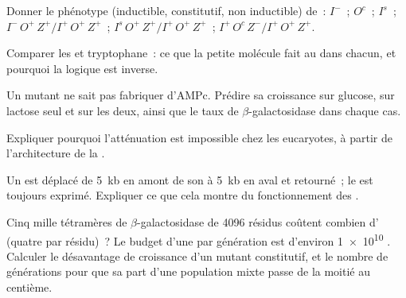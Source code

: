 \begin{exercise}[$\star\star$]\label{exo:b1:expression-control:5}
Donner le phénotype (inductible, constitutif, non inductible) de~: $I^-$~;
$O^c$~; $I^s$~; $I^-\,O^+\,Z^+ / I^+\,O^+\,Z^+$~; $I^s\,O^+\,Z^+ /
I^+\,O^+\,Z^+$~; $I^+\,O^c\,Z^- / I^+\,O^+\,Z^+$.
\end{exercise}

\begin{exercise}[$\star\star$]\label{exo:b1:expression-control:6}
Comparer les  et tryptophane~: ce que la petite molécule
fait au  dans chacun, et pourquoi la logique est inverse.
\end{exercise}

\begin{exercise}[$\star\star$]\label{exo:b1:expression-control:7}
Un mutant ne sait pas fabriquer d'AMPc. Prédire sa croissance sur
glucose, sur lactose seul et sur les deux, ainsi que le taux de
$\beta$-galactosidase dans chaque cas.
\end{exercise}

\begin{exercise}[$\star\star$]\label{exo:b1:expression-control:8}
Expliquer pourquoi l'atténuation est impossible chez les eucaryotes, à
partir de l'architecture de la .
\end{exercise}

\begin{exercise}[$\star\star$]\label{exo:b1:expression-control:9}
Un  est déplacé de \qty{5}{kb} en amont de son  à
\qty{5}{kb} en aval et retourné~; le  est toujours exprimé.
Expliquer ce que cela montre du fonctionnement des .
\end{exercise}

\begin{exercise}[$\star\star\star$]\label{exo:b1:expression-control:10}
Cinq mille tétramères de $\beta$-galactosidase de \qty{4096}{} résidus
coûtent combien d' (quatre par résidu)~? Le budget d'une  par
génération est d'environ \qty{1e10}{} . Calculer le désavantage de
croissance d'un mutant constitutif, et le nombre de générations pour que
sa part d'une population mixte passe de la moitié au centième.
\end{exercise}

